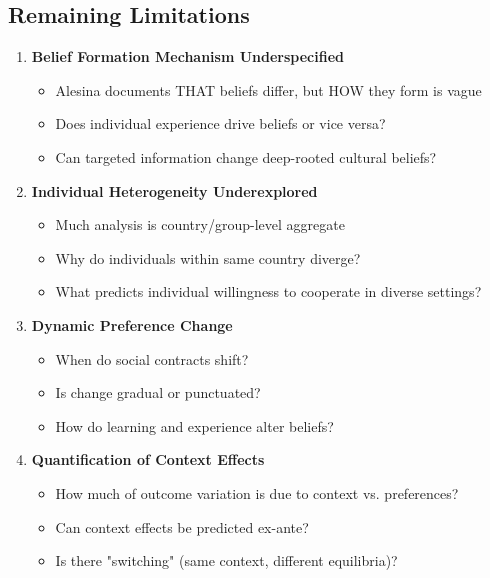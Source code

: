 \subsection{Remaining Limitations}

\begin{tcolorbox}[colback=red!5!white, colframe=red!75!black,
    title=Limitations and Extensions Needed]

\begin{enumerate}

\item \textbf{Belief Formation Mechanism Underspecified}
   \begin{itemize}
   \item Alesina documents THAT beliefs differ, but HOW they form is vague
   \item Does individual experience drive beliefs or vice versa?
   \item Can targeted information change deep-rooted cultural beliefs?
   \end{itemize}

\item \textbf{Individual Heterogeneity Underexplored}
   \begin{itemize}
   \item Much analysis is country/group-level aggregate
   \item Why do individuals within same country diverge?
   \item What predicts individual willingness to cooperate in diverse settings?
   \end{itemize}

\item \textbf{Dynamic Preference Change}
   \begin{itemize}
   \item When do social contracts shift?
   \item Is change gradual or punctuated?
   \item How do learning and experience alter beliefs?
   \end{itemize}

\item \textbf{Quantification of Context Effects}
   \begin{itemize}
   \item How much of outcome variation is due to context vs. preferences?
   \item Can context effects be predicted ex-ante?
   \item Is there "switching" (same context, different equilibria)?
   \end{itemize}

\end{enumerate}

\end{tcolorbox}

